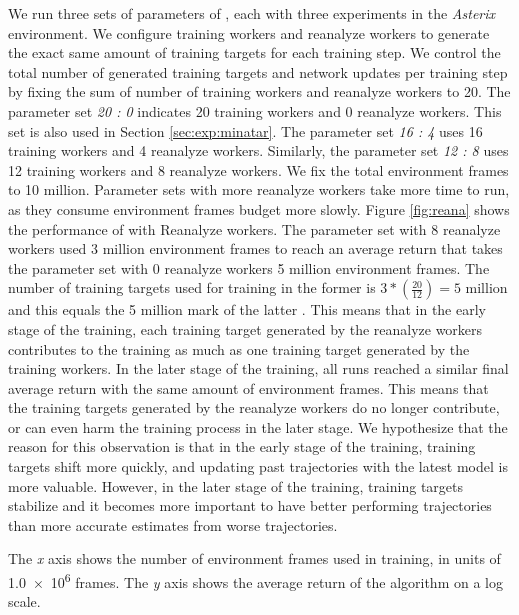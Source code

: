 We run three sets of parameters of \moozi, each with three experiments in the \textit{Asterix} environment.
We configure training workers and reanalyze workers to generate the exact same amount of training targets for each training step.
We control the total number of generated training targets and network updates per training step by fixing the sum of number of training workers and reanalyze workers to 20.
The parameter set \textit{20 : 0} indicates 20 training workers and 0 reanalyze workers.
This set is also used in Section \ref{sec:exp:minatar}.
The parameter set \textit{16 : 4} uses 16 training workers and 4 reanalyze workers.
Similarly, the parameter set \textit{12 : 8} uses 12 training workers and 8 reanalyze workers.
We fix the total environment frames to 10 million.
Parameter sets with more reanalyze workers take more time to run, as they consume environment frames budget more slowly.
Figure \ref{fig:reana} shows the performance of \moozi with Reanalyze workers.
The parameter set with 8 reanalyze workers used 3 million environment frames to reach an average return that takes the parameter set with 0 reanalyze workers 5 million environment frames.
The number of training targets used for training in the former is $3 * (\frac{20}{12}) = 5$ million and this equals the 5 million mark of the latter .
This means that in the early stage of the training, each training target generated by the reanalyze workers contributes to the training as much as one training target generated by the training workers.
In the later stage of the training, all runs reached a similar final average return with the same amount of environment frames.
This means that the training targets generated by the reanalyze workers do no longer contribute, or can even harm the training process in the later stage.
We hypothesize that the reason for this observation is that in the early stage of the training, training targets shift more quickly, and updating past trajectories with the latest model is more valuable.
However, in the later stage of the training, training targets stabilize and it becomes more important to have better performing trajectories than more accurate estimates from worse trajectories.

{
    The \textit{x} axis shows the number of environment frames used in training, in units of \num{1.0e6} frames.
    The \textit{y} axis shows the average return of the algorithm on a log scale.
}

